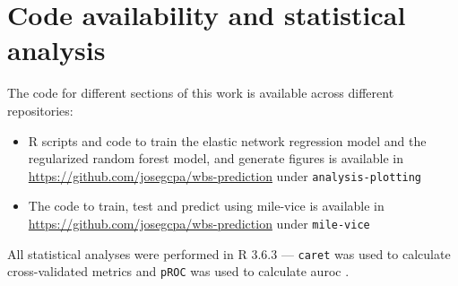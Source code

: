 \section{Code availability and statistical analysis}

The code for different sections of this work is available across different repositories:

\begin{itemize}
    \item R scripts and code to train the elastic network regression model and the regularized random forest model, and generate figures is available in \url{https://github.com/josegcpa/wbs-prediction} under \texttt{analysis-plotting}
    \item The code to train, test and predict using \ac{mile-vice} is available in \url{https://github.com/josegcpa/wbs-prediction} under \texttt{mile-vice}
\end{itemize}

All statistical analyses were performed in R 3.6.3 \cite{R-core-team} --- \texttt{caret} was used to calculate cross-validated metrics \cite{Kuhn-2021-caret} and \texttt{pROC} was used to calculate \ac{auroc} \cite{Robin-2011-proc}. 
